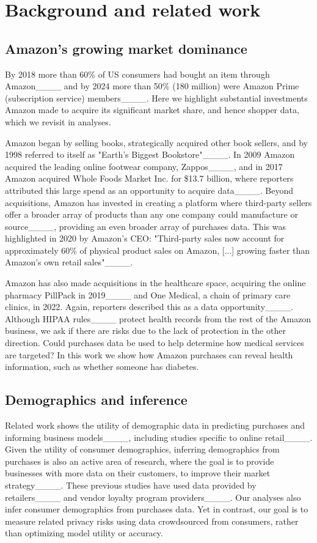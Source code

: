 \section{Background and related work}
\subsection{Amazon's growing market dominance}
\label{section:background:amazon}

By 2018 more than 60\% of US consumers had bought an item through Amazon____ and by 2024 more than 50\% (180 million) were Amazon Prime (subscription service) members____. Here we highlight substantial investments Amazon made to acquire its significant market share, and hence shopper data, which we revisit in analyses.

Amazon began by selling books, strategically acquired other book sellers, and by 1998 referred to itself as "Earth's Biggest Bookstore"____.
In 2009 Amazon acquired the leading online footwear company, Zappos____, and in 2017 Amazon acquired Whole Foods Market Inc. for \$13.7 billion, where reporters attributed this large spend as an opportunity to acquire data____. 
Beyond acquisitions, Amazon has invested in creating a platform where third-party sellers offer a broader array of products than any one company could manufacture or source____, providing an even broader array of purchases data. This was highlighted in 2020 by Amazon's CEO:  "Third-party sales now account for approximately 60\% of physical product sales on Amazon, [...] growing faster than Amazon’s own retail sales"____.

Amazon has also made acquisitions in the healthcare space, acquiring the online pharmacy PillPack in 2019____ and One Medical, a chain of primary care clinics, in 2022.  
Again, reporters described this as a data opportunity____.  Although HIPAA rules____ protect health records from the rest of the Amazon business, we ask if there are risks due to the lack of protection in the other direction. Could purchases data be used to help determine how medical services are targeted? In this work we show how Amazon purchases can reveal health information, such as whether someone has diabetes.


\subsection{Demographics and inference}

Related work shows the utility of demographic data in predicting purchases and informing business models____, including studies specific to online retail____. Given the utility of consumer demographics, inferring demographics from purchases is also an active area of research, where the goal is to provide businesses with more data on their customers, to improve their market strategy____. These previous studies have used data provided by retailers____ and vendor loyalty program providers____.
Our analyses also infer consumer demographics from purchases data. 
Yet in contrast, our goal is to measure related privacy risks using data crowdsourced from consumers, rather than optimizing model utility or accuracy.

